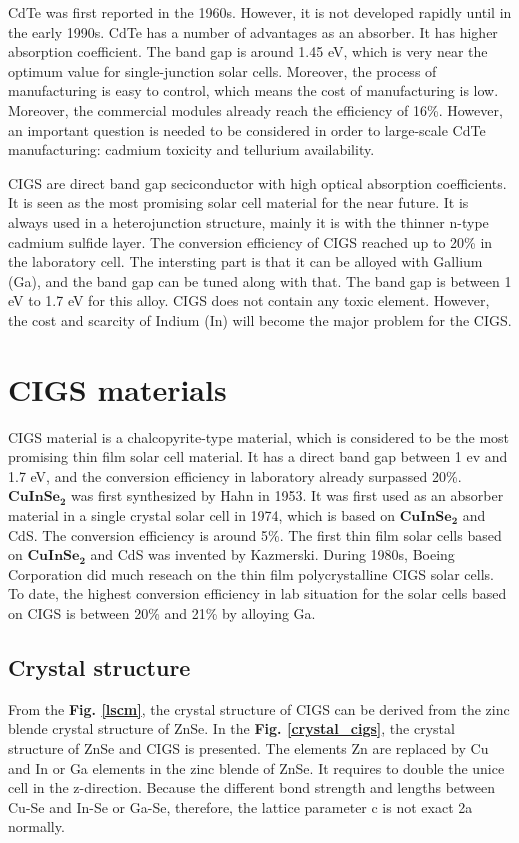 \documentclass[a4paper, 12pt, titlepage,oneside,drop]{kthesis}
\begin{document}
CdTe was first reported in the 1960s. However, it is not developed rapidly until in the early 1990s. CdTe has a number of advantages as an absorber. It has higher absorption coefficient. The band gap is around 1.45 eV, which 
is very near the optimum value for single-junction solar cells. Moreover, the process
of manufacturing is easy to control, which means the cost of manufacturing is low. Moreover, the commercial modules already reach the efficiency of 16\%. However, an important question is needed to be considered in order to large-scale CdTe
manufacturing: cadmium toxicity and tellurium availability. 

CIGS are direct band gap seciconductor with high optical absorption coefficients. It is seen as the most promising solar cell material for the near future. It is always used in a heterojunction structure, mainly it is with the thinner
n-type cadmium sulfide layer. The conversion efficiency of CIGS reached up to 20\% in the laboratory cell. The intersting part is that it can be alloyed with Gallium (Ga), and the band gap can be tuned along with that. The band gap 
is between 1 eV to 1.7 eV for this alloy. CIGS does not contain any toxic element. However, the cost and scarcity of Indium (In) will become the major problem for the CIGS.


\section{CIGS materials}
CIGS material is a chalcopyrite-type material, which is considered to be the most promising thin film solar cell material. It has a direct band gap between 1 ev and 1.7 eV,  and the conversion efficiency in laboratory already surpassed 20\%. 
$\mathbf {CuInSe_{2}}$ was first synthesized by Hahn in 1953. It was first used as an absorber material in a single crystal solar cell in 1974, which is based on $\mathbf {CuInSe_{2}}$ and CdS. The conversion efficiency is around 
5\%. The first thin film solar cells based on $\mathbf {CuInSe_{2}}$ and CdS was invented by Kazmerski. During 1980s, Boeing Corporation did much reseach on the thin film polycrystalline CIGS solar cells. 
To date, the highest conversion efficiency in lab situation for the solar cells based on CIGS is between 20\% and 21\% by alloying Ga.


\subsection{Crystal structure}
From the \textbf{Fig. \ref{lscm}}, the crystal structure of CIGS can be derived from the zinc blende crystal structure of ZnSe. In the \textbf{Fig. \ref{crystal_cigs}}, the crystal structure of ZnSe and CIGS is presented. 
The elements Zn are replaced by Cu and In or Ga elements in the zinc blende of ZnSe. It requires to double the unice cell in the z-direction. Because the different bond strength and lengths between
Cu-Se and In-Se or Ga-Se, therefore, the lattice parameter c is not exact 2a normally.
\end{document}
